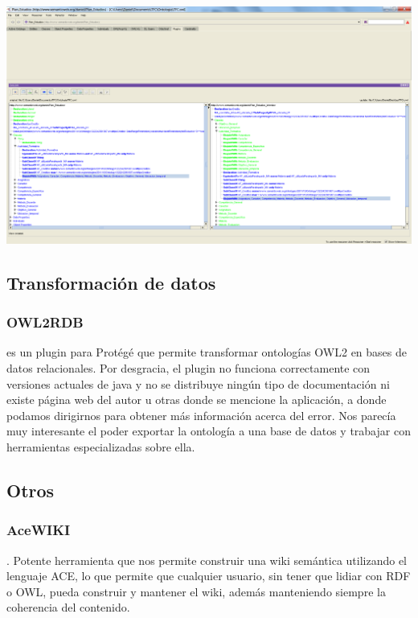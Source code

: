 \begin{center}
		\includegraphics[width=1.00\textwidth]{Imagenes/Herramientas-OWLdiff.png}
\end{center}


\subsection{Transformación de datos}

\subsubsection{OWL2RDB} es un plugin para Protégé que permite transformar ontologías OWL2 en bases de datos relacionales. Por desgracia, el plugin no funciona correctamente con versiones actuales de java y no se distribuye ningún tipo de documentación ni existe página web del autor u otras donde se mencione la aplicación, a donde podamos dirigirnos para obtener más información acerca del error. Nos parecía muy interesante el poder exportar la ontología a una base de datos y trabajar con herramientas especializadas sobre ella.

\subsection{Otros}

\subsubsection{AceWIKI}. Potente herramienta que nos permite construir una wiki semántica utilizando el lenguaje ACE, lo que permite que cualquier usuario, sin tener que lidiar con RDF o OWL, pueda construir y mantener el wiki, además manteniendo siempre la coherencia del contenido. 

